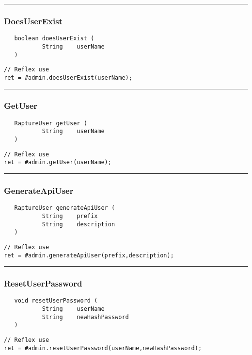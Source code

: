 \rule{15cm}{2pt}
\subsubsection{DoesUserExist}
\label{Api:DoesUserExist}
\begin{verbatim}
   boolean doesUserExist (
           String    userName
   )
\end{verbatim}
\begin{lstlisting}[language=reflex]
// Reflex use
ret = #admin.doesUserExist(userName);
\end{lstlisting}



\rule{15cm}{2pt}
\subsubsection{GetUser}
\label{Api:GetUser}
\begin{verbatim}
   RaptureUser getUser (
           String    userName
   )
\end{verbatim}
\begin{lstlisting}[language=reflex]
// Reflex use
ret = #admin.getUser(userName);
\end{lstlisting}



\rule{15cm}{2pt}
\subsubsection{GenerateApiUser}
\label{Api:GenerateApiUser}
\begin{verbatim}
   RaptureUser generateApiUser (
           String    prefix
           String    description
   )
\end{verbatim}
\begin{lstlisting}[language=reflex]
// Reflex use
ret = #admin.generateApiUser(prefix,description);
\end{lstlisting}



\rule{15cm}{2pt}
\subsubsection{ResetUserPassword}
\label{Api:ResetUserPassword}
\begin{verbatim}
   void resetUserPassword (
           String    userName
           String    newHashPassword
   )
\end{verbatim}
\begin{lstlisting}[language=reflex]
// Reflex use
ret = #admin.resetUserPassword(userName,newHashPassword);
\end{lstlisting}



